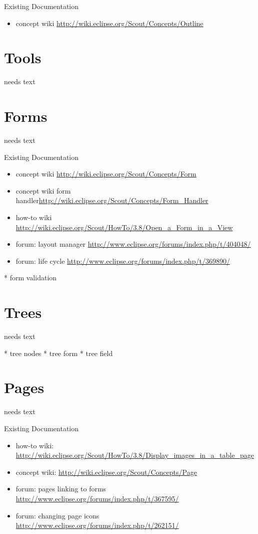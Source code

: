 \documentclass[a4paper,10pt,twoside]{book}
\begin{document}
\noindent Existing Documentation
\begin{itemize}
  \item concept wiki \url{http://wiki.eclipse.org/Scout/Concepts/Outline}
\end{itemize}

\section{Tools}
needs text

	
\section{Forms}
needs text

\noindent Existing Documentation
\begin{itemize}
  \item concept wiki \url{http://wiki.eclipse.org/Scout/Concepts/Form}
  \item concept wiki form handler\url{http://wiki.eclipse.org/Scout/Concepts/Form_Handler}
  \item how-to wiki \url{http://wiki.eclipse.org/Scout/HowTo/3.8/Open_a_Form_in_a_View}
  \item forum: layout manager \url{http://www.eclipse.org/forums/index.php/t/404048/}
  \item forum: life cycle \url{http://www.eclipse.org/forums/index.php/t/369890/}
\end{itemize}

	* form validation

\section{Trees}
needs text

    * tree nodes
	* tree form
	* tree field

\section{Pages}
needs text

\noindent Existing Documentation
\begin{itemize}
  \item how-to wiki: \url{http://wiki.eclipse.org/Scout/HowTo/3.8/Display_images_in_a_table_page}	
  \item concept wiki: \url{http://wiki.eclipse.org/Scout/Concepts/Page}
  \item forum: pages linking to forms \url{http://www.eclipse.org/forums/index.php/t/367595/}
  \item forum: changing page icons \url{http://www.eclipse.org/forums/index.php/t/262151/}
\end{itemize}
\end{document}
